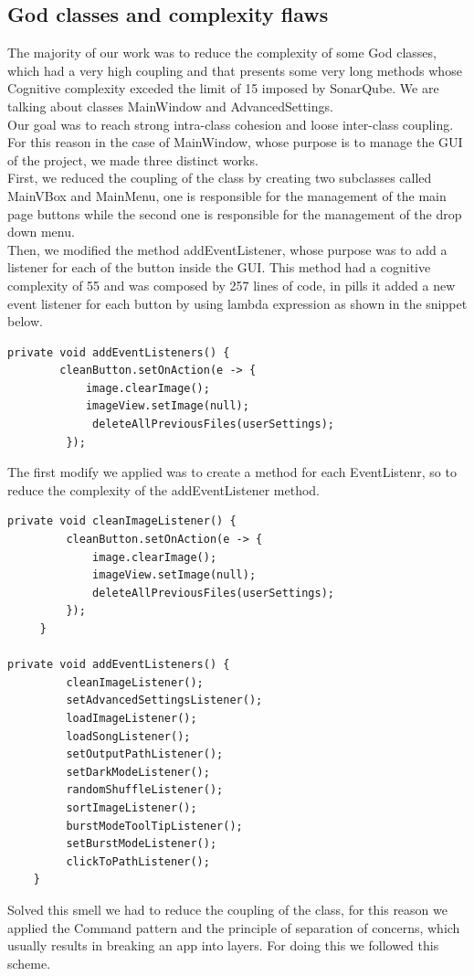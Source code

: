 \documentclass{article}
\begin{document}
\subsection{God classes and complexity flaws}
The majority of our work was to reduce the complexity of some God classes, which had a very high coupling and that presents some very long methods whose Cognitive complexity exceded the limit of 15 imposed by SonarQube.
We are talking about classes MainWindow and AdvancedSettings.\\
Our goal was to reach strong intra-class cohesion and loose inter-class coupling. 
For this reason in the case of MainWindow, whose purpose is to manage the GUI of the project, we made three distinct works.\\
First, we reduced the coupling of the class by creating two subclasses called MainVBox and MainMenu, one is responsible for the management of the main page buttons while the second one is responsible for the management of the drop down menu.\\
Then, we modified the method addEventListener, whose  purpose was to add a listener for each of the button inside the GUI. This method had a cognitive complexity of 55 and was composed by 257 lines of code, in pills it added a new event listener for each button by using lambda expression as shown in the snippet below.\\

\begin{lstlisting}
private void addEventListeners() {
        cleanButton.setOnAction(e -> {
            image.clearImage();
            imageView.setImage(null);
             deleteAllPreviousFiles(userSettings);
         });
\end{lstlisting}
The first modify we applied was to create a method for each EventListenr, so to reduce the complexity of the addEventListener method.

\begin{lstlisting}
private void cleanImageListener() {
         cleanButton.setOnAction(e -> {
             image.clearImage();
             imageView.setImage(null);
             deleteAllPreviousFiles(userSettings);
         });
     }
     
private void addEventListeners() {
         cleanImageListener();
         setAdvancedSettingsListener();
         loadImageListener();
         loadSongListener();
         setOutputPathListener();
         setDarkModeListener();
         randomShuffleListener();
         sortImageListener();
         burstModeToolTipListener();
         setBurstModeListener();
         clickToPathListener();
    }
\end{lstlisting}
Solved this smell we had to reduce the coupling of the class, for this reason we applied the Command pattern and the principle of separation of concerns, which usually results in breaking an app into layers.
For doing this we followed this scheme.
\end{document}
